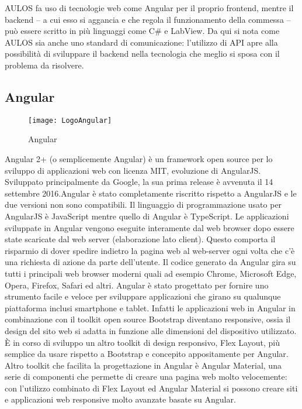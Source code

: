 AULOS fa uso di tecnologie web come Angular per il proprio frontend, mentre il backend – a cui esso si aggancia e che regola il funzionamento della commessa – può essere scritto in più linguaggi come C\# e LabView.
Da qui si nota come AULOS sia anche uno standard di comunicazione: l’utilizzo di API apre alla possibilità di sviluppare il backend nella tecnologia che meglio si sposa con il problema da risolvere.
\subsection{Angular}
\begin{figure}[htpb!]
\center
  \texttt{[image: LogoAngular]}
  \caption{Angular}
\end{figure}
Angular 2+ (o semplicemente Angular) è un framework open source per lo sviluppo di applicazioni web con licenza MIT, evoluzione di AngularJS. Sviluppato principalmente da Google, la sua prima release è avvenuta il 14 settembre 2016.Angular è stato completamente riscritto rispetto a AngularJS e le due versioni non sono compatibili. Il linguaggio di programmazione usato per AngularJS è JavaScript mentre quello di Angular è TypeScript. Le applicazioni sviluppate in Angular vengono eseguite interamente dal web browser dopo essere state scaricate dal web server (elaborazione lato client). Questo comporta il risparmio di dover spedire indietro la pagina web al web-server ogni volta che c'è una richiesta di azione da parte dell'utente. Il codice generato da Angular gira su tutti i principali web browser moderni quali ad esempio Chrome, Microsoft Edge, Opera, Firefox, Safari ed altri. Angular è stato progettato per fornire uno strumento facile e veloce per sviluppare applicazioni che girano su qualunque piattaforma inclusi smartphone e tablet. Infatti le applicazioni web in Angular in combinazione con il toolkit open source Bootstrap diventano responsive, ossia il design del sito web si adatta in funzione alle dimensioni del dispositivo utilizzato. È in corso di sviluppo un altro toolkit di design responsivo, Flex Layout, più semplice da usare rispetto a Bootstrap e concepito appositamente per Angular. Altro toolkit che facilita la progettazione in Angular è Angular Material, una serie di componenti che permette di creare una pagina web molto velocemente: con l'utilizzo combinato di Flex Layout ed Angular Material si possono creare siti e applicazioni web responsive molto avanzate basate su Angular.
